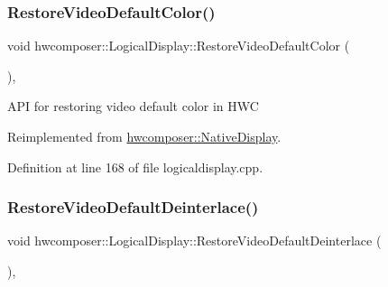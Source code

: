 \subsubsection{\texorpdfstring{Restore\+Video\+Default\+Color()}{RestoreVideoDefaultColor()}}
{\footnotesize\ttfamily void hwcomposer\+::\+Logical\+Display\+::\+Restore\+Video\+Default\+Color (\begin{DoxyParamCaption}\item[{H\+W\+C\+Color\+Control}]{ }\end{DoxyParamCaption})\hspace{0.3cm}{\ttfamily [override]}, {\ttfamily [virtual]}}

A\+PI for restoring video default color in H\+WC 

Reimplemented from \mbox{\hyperlink{classhwcomposer_1_1NativeDisplay_a06390d47f61b776338a03bee737634b3}{hwcomposer\+::\+Native\+Display}}.



Definition at line 168 of file logicaldisplay.\+cpp.


\begin{DoxyCode}{0}
\end{DoxyCode}
\mbox{\label{classhwcomposer_1_1LogicalDisplay_ad0d206b9c0e41732b2f9635fd6ffeb6c}} 
\subsubsection{\texorpdfstring{Restore\+Video\+Default\+Deinterlace()}{RestoreVideoDefaultDeinterlace()}}
{\footnotesize\ttfamily void hwcomposer\+::\+Logical\+Display\+::\+Restore\+Video\+Default\+Deinterlace (\begin{DoxyParamCaption}{ }\end{DoxyParamCaption})\hspace{0.3cm}{\ttfamily [override]}, {\ttfamily [virtual]}}

